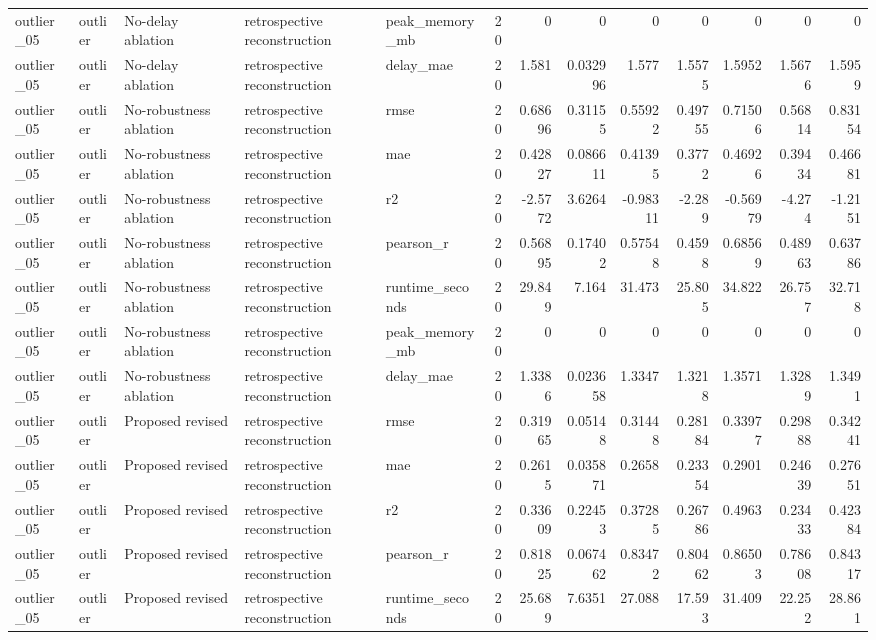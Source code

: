 \begin{table}[!htbp]
{{\begin{tabular}{lllllrrrrrrrr}
outlier_05 & outlier & No-delay ablation & retrospective reconstruction & peak_memory_mb & 20 & 0 & 0 & 0 & 0 & 0 & 0 & 0 \\
outlier_05 & outlier & No-delay ablation & retrospective reconstruction & delay_mae & 20 & 1.581 & 0.032996 & 1.577 & 1.5575 & 1.5952 & 1.5676 & 1.5959 \\
outlier_05 & outlier & No-robustness ablation & retrospective reconstruction & rmse & 20 & 0.68696 & 0.31155 & 0.55922 & 0.49755 & 0.71506 & 0.56814 & 0.83154 \\
outlier_05 & outlier & No-robustness ablation & retrospective reconstruction & mae & 20 & 0.42827 & 0.086611 & 0.41395 & 0.3772 & 0.46926 & 0.39434 & 0.46681 \\
outlier_05 & outlier & No-robustness ablation & retrospective reconstruction & r2 & 20 & -2.5772 & 3.6264 & -0.98311 & -2.289 & -0.56979 & -4.274 & -1.2151 \\
outlier_05 & outlier & No-robustness ablation & retrospective reconstruction & pearson_r & 20 & 0.56895 & 0.17402 & 0.57548 & 0.4598 & 0.68569 & 0.48963 & 0.63786 \\
outlier_05 & outlier & No-robustness ablation & retrospective reconstruction & runtime_seconds & 20 & 29.849 & 7.164 & 31.473 & 25.805 & 34.822 & 26.757 & 32.718 \\
outlier_05 & outlier & No-robustness ablation & retrospective reconstruction & peak_memory_mb & 20 & 0 & 0 & 0 & 0 & 0 & 0 & 0 \\
outlier_05 & outlier & No-robustness ablation & retrospective reconstruction & delay_mae & 20 & 1.3386 & 0.023658 & 1.3347 & 1.3218 & 1.3571 & 1.3289 & 1.3491 \\
outlier_05 & outlier & Proposed revised & retrospective reconstruction & rmse & 20 & 0.31965 & 0.05148 & 0.31448 & 0.28184 & 0.33977 & 0.29888 & 0.34241 \\
outlier_05 & outlier & Proposed revised & retrospective reconstruction & mae & 20 & 0.2615 & 0.035871 & 0.2658 & 0.23354 & 0.2901 & 0.24639 & 0.27651 \\
outlier_05 & outlier & Proposed revised & retrospective reconstruction & r2 & 20 & 0.33609 & 0.22453 & 0.37285 & 0.26786 & 0.4963 & 0.23433 & 0.42384 \\
outlier_05 & outlier & Proposed revised & retrospective reconstruction & pearson_r & 20 & 0.81825 & 0.067462 & 0.83472 & 0.80462 & 0.86503 & 0.78608 & 0.84317 \\
outlier_05 & outlier & Proposed revised & retrospective reconstruction & runtime_seconds & 20 & 25.689 & 7.6351 & 27.088 & 17.593 & 31.409 & 22.252 & 28.861 \\

\end{tabular}}}
\end{table}
